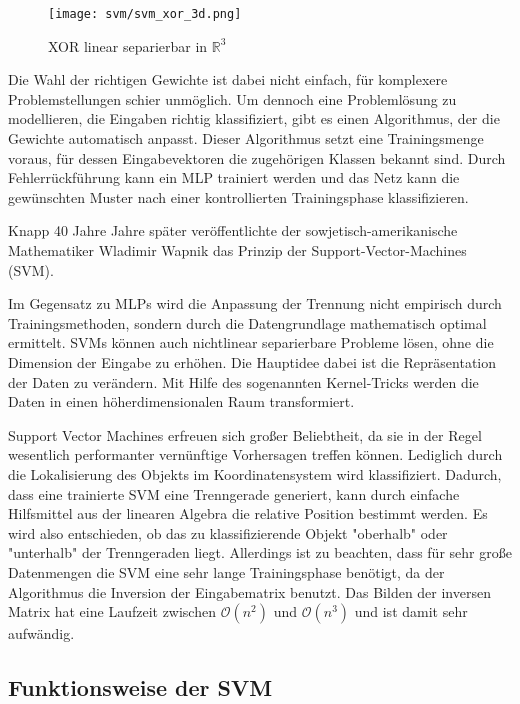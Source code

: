 \begin{figure}[htbp] \centering
    \texttt{[image: svm/svm\_xor\_3d.png]}
    \caption{XOR linear separierbar in $\mathbb{R}^3$}
    \label{fig:perceptron_xor3d}
\end{figure}

Die Wahl der richtigen Gewichte ist dabei nicht einfach, für komplexere Problemstellungen schier unmöglich. 
Um dennoch eine Problemlösung zu modellieren, die Eingaben richtig klassifiziert, gibt es einen Algorithmus, der die Gewichte automatisch anpasst.
Dieser Algorithmus setzt eine Trainingsmenge voraus, für dessen Eingabevektoren die zugehörigen Klassen bekannt sind. 
Durch Fehlerrückführung kann ein \ac{MLP} trainiert werden und das Netz kann die gewünschten Muster nach einer kontrollierten Trainingsphase klassifizieren.

Knapp 40 Jahre Jahre später veröffentlichte der sowjetisch-amerikanische Mathematiker Wladimir Wapnik \cite{Vapnik} das Prinzip der Support-Vector-Machines (\ac{SVM}).

Im Gegensatz zu \ac{MLP}s wird die Anpassung der Trennung nicht empirisch durch Trainingsmethoden, sondern durch die Datengrundlage mathematisch optimal ermittelt. 
SVMs können auch nichtlinear separierbare Probleme lösen, ohne die Dimension der Eingabe zu erhöhen. 
Die Hauptidee dabei ist die Repräsentation der Daten zu verändern. 
Mit Hilfe des sogenannten Kernel-Tricks werden die Daten in einen höherdimensionalen Raum transformiert. 

Support Vector Machines erfreuen sich großer Beliebtheit, da sie in der Regel wesentlich performanter vernünftige Vorhersagen treffen können. Lediglich durch die Lokalisierung des Objekts im Koordinatensystem wird klassifiziert. Dadurch, dass eine trainierte SVM eine Trenngerade generiert, kann durch einfache Hilfsmittel aus der linearen Algebra die relative Position bestimmt werden. Es wird also entschieden, ob das zu klassifizierende Objekt "{}oberhalb"{} oder "{}unterhalb"{} der Trenngeraden liegt. Allerdings ist zu beachten, dass für sehr große Datenmengen die \ac{SVM} eine sehr lange Trainingsphase benötigt, da der Algorithmus die Inversion der Eingabematrix benutzt. Das Bilden der inversen Matrix hat eine Laufzeit zwischen $\mathcal O(n^2)$ und $\mathcal O(n^3)$ und ist damit sehr aufwändig.

\subsection{Funktionsweise der SVM}

